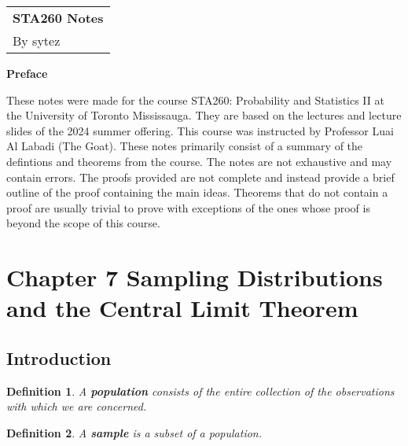 \documentclass[a4paper,12pt]{article}
\theoremstyle{nonitalic}
\newtheorem{definition}{Definition}[subsection]
\begin{document}
    \thispagestyle{empty}

    \begin{tabular}{p{15.5cm}}  
        {\Large \bf STA260 Notes}\\
        By sytez\\
        \hline
    \end{tabular}

    \begin{center}
        {\Large \bf Preface}
    \end{center}

    \quad These notes were made for the course STA260: Probability and Statistics II at the University of Toronto Mississauga. They are based on the lectures and lecture slides of the 2024 summer offering. This course was instructed by Professor Luai Al Labadi (The Goat). These notes primarily consist of a summary of the defintions and theorems from the course. The notes are not exhaustive and may contain errors. The proofs provided are not complete and instead provide a brief outline of the proof containing the main ideas. Theorems that do not contain a proof are usually trivial to prove with exceptions of the ones whose proof is beyond the scope of this course.

    \newpage
    
    \tableofcontents
    \newpage

    \setcounter{section}{6}

    \section{Chapter 7 \textemdash{} Sampling Distributions and the Central Limit Theorem}

    \subsection{Introduction}

    \begin{definition}
        A \textbf{population} consists of the entire collection of the observations with which we are concerned.
    \end{definition}

    \bigskip

    \begin{definition}
        A \textbf{sample} is a subset of a population.
    \end{definition}

    \bigskip
\end{document}

